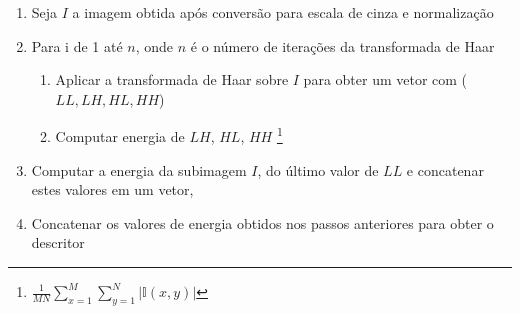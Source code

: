 \begin{enumerate}
\item Seja $I$ a imagem obtida após conversão para escala de cinza e normalização
\item Para i de 1 até $n$, onde $n$ é o número de iterações da transformada de Haar
  \begin{enumerate}
    \item Aplicar a transformada de Haar sobre $I$ para obter um vetor com ($LL, LH, HL, HH$)
    \item Computar energia de $LH$, $HL$, $HH$ \footnote{$  \frac{1}{MN}\sum_{x=1}^M \sum_{y=1}^N |\mathbb{I}(x,y)|$}
  \end{enumerate}
\item Computar a energia da subimagem $I$, do último valor de $LL$ e concatenar estes valores em um vetor,

\item Concatenar os valores de energia obtidos nos passos anteriores para obter o descritor
\end{enumerate}

